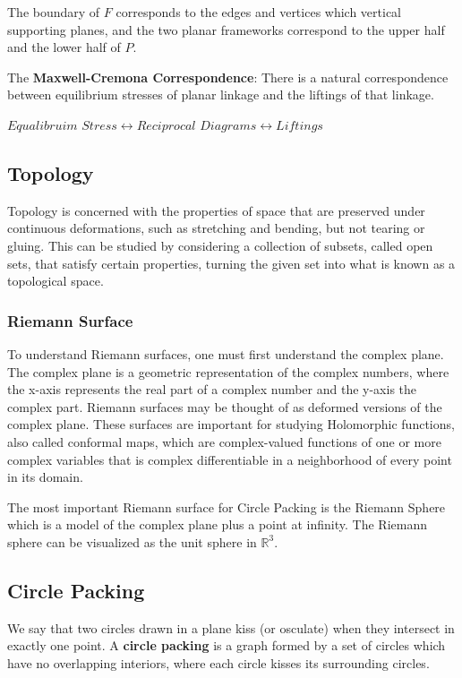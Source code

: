 \documentclass{article}
\begin{document}
 The boundary of $F$ corresponds to the edges and vertices which vertical supporting planes, and the two planar frameworks correspond to the upper half and the lower half of $P$.
 
 The \textbf{Maxwell-Cremona Correspondence}: There is a natural correspondence between equilibrium stresses of planar linkage and the liftings of that linkage. 
 
 $Equalibruim$  $Stress \leftrightarrow Reciprocal$ $Diagrams \leftrightarrow Liftings$
 
  \subsection{Topology}
 Topology is concerned with the properties of space that are preserved under continuous deformations, such as stretching and bending, but not tearing or gluing. This can be studied by considering a collection of subsets, called open sets, that satisfy certain properties, turning the given set into what is known as a topological space. 
  \subsubsection{Riemann Surface}
  To understand Riemann surfaces, one must first understand the complex plane. The complex plane is a geometric representation of the complex numbers, where the x-axis represents the real part of a complex number and the y-axis the complex part. Riemann surfaces may be thought of as deformed versions of the complex plane. These surfaces are important for studying Holomorphic functions, also called conformal maps, which are complex-valued functions of one or more complex variables that is complex differentiable in a neighborhood of every point in its domain.
  
  The most important Riemann surface for Circle Packing is the Riemann Sphere which is a model of the complex plane plus a point at infinity. The Riemann sphere can be visualized as the unit sphere in $\mathbb{R}^3$. 


 \subsection{Circle Packing}
  We say that two circles drawn in a plane kiss (or osculate) when they intersect in exactly one point. 
  A \textbf{circle packing} is a graph formed by a set of circles which have no overlapping interiors, where each circle kisses its surrounding circles.
  
\end{document}
